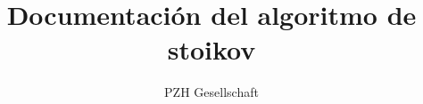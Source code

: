 \documentclass[11pt]{article}
\begin{document}
\title{Documentación del algoritmo de stoikov}
\author{PZH Gesellschaft}
\maketitle
\end{document}

